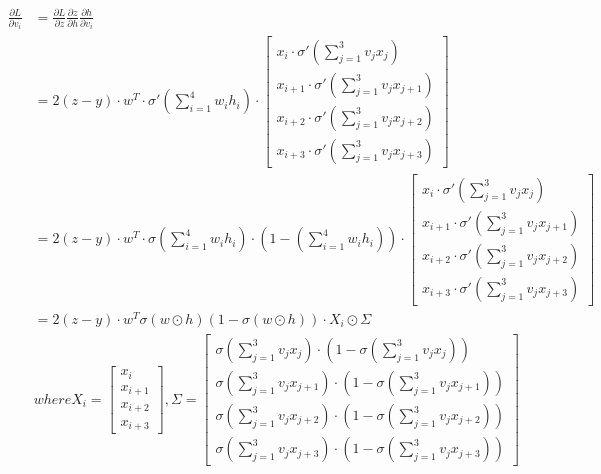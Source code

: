 \documentclass[oneside,solution]{seu-ml-assign}
\begin{document}
\subproblem{}
\begin{equation}\begin{aligned}\frac{\partial L}{\partial v_{i}} & =\frac{\partial L}{\partial z}
               \frac{\partial z}{\partial h}\frac{\partial h}{\partial v_{i}}                                                                                                                                                                                                                                                                                              \\&=2(z-y)\cdot w^{T}\cdot\sigma'
               \left(\sum_{i=1}^{4}w_{i}h_{i}\right) \cdot \begin{bmatrix} x_{i} \cdot \sigma'(\sum_{j=1}^{3}v_{j}x_{j})\\  x_{i+1} \cdot \sigma'(\sum_{j=1}^{3}v_{j}x_{j+1})\\  x_{i+2} \cdot \sigma'(\sum_{j=1}^{3}v_{j}x_{j+2})  \\ x_{i+3} \cdot \sigma'(\sum_{j=1}^{3}v_{j}x_{j+3})  \end{bmatrix}                                                     \\
                                                 & =2(z-y)\cdot w^{T}\cdot\sigma
               \left(\sum_{i=1}^{4}w_{i}h_{i}\right)  \cdot (1-\left(\sum_{i=1}^{4}w_{i}h_{i}\right)  )  \cdot \begin{bmatrix} x_{i} \cdot \sigma'(\sum_{j=1}^{3}v_{j}x_{j})\\  x_{i+1} \cdot \sigma'(\sum_{j=1}^{3}v_{j}x_{j+1})\\  x_{i+2} \cdot \sigma'(\sum_{j=1}^{3}v_{j}x_{j+2})  \\ x_{i+3} \cdot \sigma'(\sum_{j=1}^{3}v_{j}x_{j+3})  \end{bmatrix} \\&=2(z-y)\cdot w^{T}\sigma\left(w \odot h\right)
               \left(1-\sigma\left(w \odot h\right)\right)\cdot X_{i}\odot\Sigma                                                                                                                                                                                                                                                                                           
               \\&where X_{i}=\begin{bmatrix}x_{i} \\x_{i+1}\\x_{i+2}\\x_{i+3}
    \end{bmatrix},\Sigma = \begin{bmatrix}\sigma(\sum_{j=1}^{3}v_{j}x_{j})\cdot(1-\sigma(\sum_{j=1}^{3}v_{j}x_{j}))\\\sigma(\sum_{j=1}^{3}v_{j}x_{j+1})\cdot(1-\sigma(\sum_{j=1}^{3}v_{j}x_{j+1}))\\\sigma(\sum_{j=1}^{3}v_{j}x_{j+2})\cdot(1-\sigma(\sum_{j=1}^{3}v_{j}x_{j+2}))\\\sigma(\sum_{j=1}^{3}v_{j}x_{j+3})\cdot(1-\sigma(\sum_{j=1}^{3}v_{j}x_{j+3}))\end{bmatrix}\end{aligned}
\end{equation}
\end{document}
